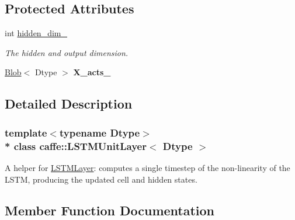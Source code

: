 \subsection*{Protected Attributes}
\begin{DoxyCompactItemize}
\item 
int \hyperlink{classcaffe_1_1LSTMUnitLayer_a7ffcad2a4e6ca83f03cc88dffa32b7ca}{hidden\+\_\+dim\+\_\+}\hypertarget{classcaffe_1_1LSTMUnitLayer_a7ffcad2a4e6ca83f03cc88dffa32b7ca}{}\label{classcaffe_1_1LSTMUnitLayer_a7ffcad2a4e6ca83f03cc88dffa32b7ca}

\begin{DoxyCompactList}\small\item\em The hidden and output dimension. \end{DoxyCompactList}\item 
\hyperlink{classcaffe_1_1Blob}{Blob}$<$ Dtype $>$ {\bfseries X\+\_\+acts\+\_\+}\hypertarget{classcaffe_1_1LSTMUnitLayer_a136b722511c1dd446b8ec2298439d805}{}\label{classcaffe_1_1LSTMUnitLayer_a136b722511c1dd446b8ec2298439d805}

\end{DoxyCompactItemize}


\subsection{Detailed Description}
\subsubsection*{template$<$typename Dtype$>$\\*
class caffe\+::\+L\+S\+T\+M\+Unit\+Layer$<$ Dtype $>$}

A helper for \hyperlink{classcaffe_1_1LSTMLayer}{L\+S\+T\+M\+Layer}\+: computes a single timestep of the non-\/linearity of the L\+S\+TM, producing the updated cell and hidden states. 

\subsection{Member Function Documentation}
